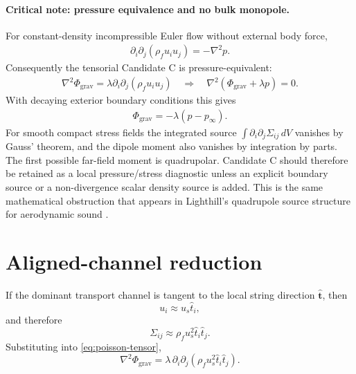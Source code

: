 \documentclass[11pt]{article}
\newcommand{\rhoF}{\rho_{\!f}}
\newcommand{\grav}{\mathrm{grav}}
\begin{document}
            \paragraph{Critical note: pressure equivalence and no bulk monopole.}
            For constant-density incompressible Euler flow without external body force,
            \begin{align}
                \partial_i\partial_j\left(\rhoF u_i u_j\right)
                =
                -\nabla^2p .
            \end{align}
            Consequently the tensorial Candidate C is pressure-equivalent:
            \begin{align}
                \nabla^2\Phi_{\grav}
                =
                \lambda\partial_i\partial_j(\rhoF u_i u_j)
                \quad\Longrightarrow\quad
                \nabla^2(\Phi_{\grav}+\lambda p)=0 .
            \end{align}
            With decaying exterior boundary conditions this gives
            \begin{align}
                \Phi_{\grav}=-\lambda(p-p_\infty) .
            \end{align}
            For smooth compact stress fields the integrated source
            \(\int\partial_i\partial_j\Sigma_{ij}\,dV\) vanishes by Gauss' theorem, and the
            dipole moment also vanishes by integration by parts.  The first possible
            far-field moment is quadrupolar.  Candidate C should therefore be retained as a
            local pressure/stress diagnostic unless an explicit boundary source or a
            non-divergence scalar density source is added.  This is the same mathematical
            obstruction that appears in Lighthill's quadrupole source structure for
            aerodynamic sound \cite{Lighthill1952}.
        
        \section{Aligned-channel reduction}
        
        If the dominant transport channel is tangent to the local string direction \(\hat{\mathbf t}\), then
        \[
            u_i \approx u_s \hat t_i,
        \]
        and therefore
        \begin{equation}
            \Sigma_{ij}
            \approx
            \rhoF u_s^2 \hat t_i \hat t_j.
            \label{eq:Sigma-aligned}
        \end{equation}
        Substituting into \eqref{eq:poisson-tensor},
        \begin{equation}
            \boxed{
                \nabla^2 \Phi_{\grav}
                =
                \lambda\,\partial_i\partial_j
                \left(
                    \rhoF u_s^2 \hat t_i \hat t_j
                \right).
            }
            \label{eq:poisson-aligned}
        \end{equation}
        
\end{document}
